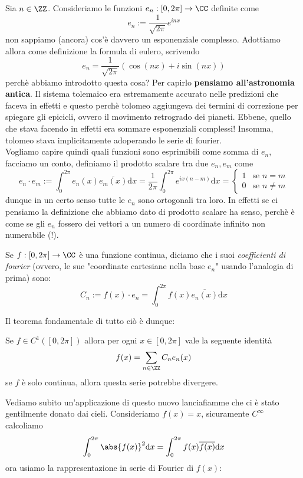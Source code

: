 \documentclass[11pt]{scrartcl}
\newcommand{\dif}{\text{d}}
\begin{document}
  Sia $n\in\ZZ$. Consideriamo le funzioni $e_n:[0,2\pi]\to \CC$ definite come
  $$e_n:=\frac{1}{\sqrt{2\pi}}e^{inx}$$
  non sappiamo (ancora) cos'è davvero un esponenziale complesso. Adottiamo allora come definizione la formula di eulero, scrivendo
  $$e_n=\frac{1}{\sqrt{2\pi}}\left(\cos(nx)+i\sin(nx)\right)$$
  perchè abbiamo introdotto questa cosa? Per capirlo \textbf{pensiamo all'astronomia antica}. Il sistema tolemaico era estremamente accurato nelle predizioni che faceva in effetti e questo perchè tolomeo aggiungeva dei termini di correzione per spiegare gli epicicli, ovvero il movimento retrogrado dei pianeti. Ebbene, quello che stava facendo in effetti era sommare esponenziali complessi! Insomma, tolomeo stava implicitamente adoperando le serie di fourier. \\
  Vogliamo capire quindi quali funzioni sono esprimibili come somma di $e_n$, facciamo un conto, definiamo il prodotto scalare tra due $e_n,e_m$ come
  $$e_n\cdot e_m:=\int_0^{2\pi}e_n(x)\overline{e_m(x)}\dif x=\frac{1}{2\pi}\int_0^{2\pi}e^{ix(n-m)}\dif x=
  \begin{cases}
  	1 & \text{se $n=m$} \\
  	0 & \text{se $n\ne m$}
  \end{cases}
  $$
  dunque in un certo senso tutte le $e_n$ sono ortogonali tra loro. In effetti se ci pensiamo la definizione che abbiamo dato di prodotto scalare ha senso, perchè è come se gli $e_n$ fossero dei vettori a un numero di coordinate infinito non numerabile (!). \\
  \begin{definition}
  	Se $f:[0,2\pi]\to \CC$ è una funzione continua, diciamo che i suoi \textit{coefficienti di fourier} (ovvero, le sue "coordinate cartesiane nella base $e_n$" usando l'analogia di prima) sono:
  	$$C_n:=f(x)\cdot e_n=\int_0^{2\pi}f(x)\overline{e_n(x)}\dif x$$
  \end{definition}
  Il teorema fondamentale di tutto ciò è dunque:
  \begin{theorem}[Fourier]
  	Se $f\in C^1([0,2\pi])$ allora per ogni $x\in[0,2\pi]$ vale la seguente identità
  	$$f(x)=\sum_{n\in\ZZ} C_ne_n(x)$$
  	se $f$ è solo continua, allora questa serie potrebbe divergere.
  \end{theorem}
  Vediamo subito un'applicazione di questo nuovo lanciafiamme che ci è stato gentilmente donato dai cieli. Consideriamo $f(x)=x$, sicuramente $C^\infty$ calcoliamo
  $$\int_0^{2\pi}\abs{f(x)}^2\dif x=\int_{0}^{2\pi}f(x)\overline{f(x)}\dif x$$
  ora usiamo la rappresentazione in serie di Fourier di $f(x)$:
\end{document}
